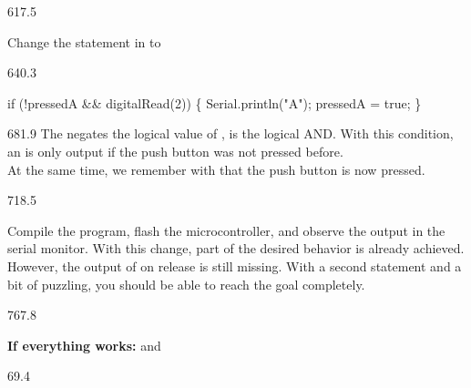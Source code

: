 \documentclass{aslab}
\makeatletter
\newcommand*\aN[1]{\textcolor{codeorange}{#1}}%
\newcommand*\aK[1]{\textcolor{codered}{#1}}%
\newcommand*\aR[1]{\textcolor{codecyan}{#1}}%
\newenvironment{asmlisting}[1][11]{\par
  \edef\asm@bs{\the\baselineskip}\fontsize{#1bp}{\asm@bs}\selectfont
  \ttfamily\asm@setup}{\par}
\makeatother
\begin{document}
\begin{region}[free]{617.5}
\begin{numlist}[start=2]
\item Change the  statement in  to
\end{numlist}
\end{region}

\begin{region}[x=74.7,right=0,pitch=10]{640.3}
\begin{asmlisting}[9]
\aN{if} (!pressedA \&\& \aR{digitalRead}(\aK{2})) \{
    \aR{Serial}.\aR{println}(\aK{"A"});
    pressedA = \aK{true};
\}
\end{asmlisting}
\end{region}

\begin{region}[x=74.7,right=0,pitch=12.3]{681.9}
The \code{!} negates the logical value of , \code{&&} is the
logical AND. With this condition, an  is only output if the push
button was not pressed before.\\
At the same time, we remember with  that the push
button is now pressed.
\end{region}

\begin{region}[pitch=12.1]{718.5}
\begin{numlist}[start=3]
\item Compile the program, flash the microcontroller, and observe the output
  in the serial monitor. With this change, part of the desired behavior is
  already achieved. However, the output of  on release is still
  missing. With a second  statement and a bit of puzzling, you
  should be able to reach the goal completely.
\end{numlist}
\end{region}

\begin{region}{767.8}
\begin{numlist}[start=4]
\item \textbf{If everything works:}  and
\end{numlist}
\end{region}

\nextpage
\begin{region}{69.4}
\end{region}
\end{document}
